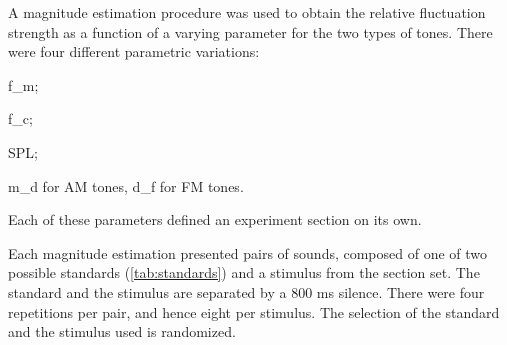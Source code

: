 \documentclass[../main.tex]{subfiles}
\begin{document}
A magnitude estimation procedure was used to obtain the relative fluctuation
strength as a function of a varying parameter for the two types of tones. There
were four different parametric variations:
\begin{inparaenum}[(1)]
  \item \gls{f_m};
  \item \gls{f_c};
  \item \gls{SPL};
  \item \gls{m_d} for \gls{AM} tones, \gls{d_f} for \gls{FM} tones.
\end{inparaenum}
Each of these parameters defined an experiment section on its own.

Each magnitude estimation presented pairs of sounds, composed of one of two
possible standards (\cref{tab:standards}) and a stimulus from the section set.
The standard and the stimulus are separated by a 800 ms silence. There were four
repetitions per pair, and hence eight per stimulus. The selection of the
standard and the stimulus used is randomized.
\end{document}
